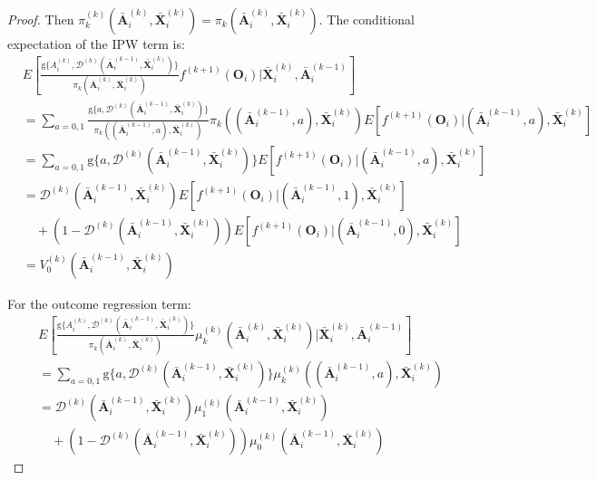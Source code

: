 \documentclass[11pt]{article}
\theoremstyle{referenceplain}
\theoremstyle{referencedefinition}
\theoremstyle{referenceremark}
\begin{document}
\begin{proof}
Then $\pi_k^{(k)}(\bar{\mathbf{A}}_i^{(k)}, \bar{\mathbf{X}}_i^{(k)}) = \pi_k(\bar{\mathbf{A}}_i^{(k)}, \bar{\mathbf{X}}_i^{(k)})$. The conditional expectation of the IPW term is:
\begin{align*}
    &E\left[\frac{\mathrm{g}\{A_i^{(k)}, \mathcal{D}^{(k)}(\bar{\mathbf{A}}_i^{(k-1)}, \bar{\mathbf{X}}_i^{(k)})\}}{\pi_k(\bar{\mathbf{A}}_i^{(k)}, \bar{\mathbf{X}}_i^{(k)})} f^{(k+1)}(\mathbf{O}_i)\bigg|\bar{\mathbf{X}}_i^{(k)}, \bar{\mathbf{A}}_i^{(k-1)}\right]\\
    &= \sum_{a=0,1} \frac{\mathrm{g}\{a, \mathcal{D}^{(k)}(\bar{\mathbf{A}}_i^{(k-1)}, \bar{\mathbf{X}}_i^{(k)})\}}{\pi_k((\bar{\mathbf{A}}_i^{(k-1)}, a), \bar{\mathbf{X}}_i^{(k)})} \pi_k((\bar{\mathbf{A}}_i^{(k-1)}, a), \bar{\mathbf{X}}_i^{(k)}) E[f^{(k+1)}(\mathbf{O}_i)|(\bar{\mathbf{A}}_i^{(k-1)}, a), \bar{\mathbf{X}}_i^{(k)}]\\
    &= \sum_{a=0,1} \mathrm{g}\{a, \mathcal{D}^{(k)}(\bar{\mathbf{A}}_i^{(k-1)}, \bar{\mathbf{X}}_i^{(k)})\} E[f^{(k+1)}(\mathbf{O}_i)|(\bar{\mathbf{A}}_i^{(k-1)}, a), \bar{\mathbf{X}}_i^{(k)}]\\
    &= \mathcal{D}^{(k)}(\bar{\mathbf{A}}_i^{(k-1)}, \bar{\mathbf{X}}_i^{(k)}) E[f^{(k+1)}(\mathbf{O}_i)|(\bar{\mathbf{A}}_i^{(k-1)}, 1), \bar{\mathbf{X}}_i^{(k)}]\\
    &\quad + (1-\mathcal{D}^{(k)}(\bar{\mathbf{A}}_i^{(k-1)}, \bar{\mathbf{X}}_i^{(k)})) E[f^{(k+1)}(\mathbf{O}_i)|(\bar{\mathbf{A}}_i^{(k-1)}, 0), \bar{\mathbf{X}}_i^{(k)}]\\
    &= V_0^{(k)}(\bar{\mathbf{A}}_i^{(k-1)}, \bar{\mathbf{X}}_i^{(k)})
\end{align*}

For the outcome regression term:
\begin{align*}
    &E\left[\frac{\mathrm{g}\{A_i^{(k)}, \mathcal{D}^{(k)}(\bar{\mathbf{A}}_i^{(k-1)}, \bar{\mathbf{X}}_i^{(k)})\}}{\pi_k(\bar{\mathbf{A}}_i^{(k)}, \bar{\mathbf{X}}_i^{(k)})} \mu_k^{(k)}(\bar{\mathbf{A}}_i^{(k)}, \bar{\mathbf{X}}_i^{(k)})\bigg|\bar{\mathbf{X}}_i^{(k)}, \bar{\mathbf{A}}_i^{(k-1)}\right]\\
    &= \sum_{a=0,1} \mathrm{g}\{a, \mathcal{D}^{(k)}(\bar{\mathbf{A}}_i^{(k-1)}, \bar{\mathbf{X}}_i^{(k)})\} \mu_k^{(k)}((\bar{\mathbf{A}}_i^{(k-1)}, a), \bar{\mathbf{X}}_i^{(k)})\\
    &= \mathcal{D}^{(k)}(\bar{\mathbf{A}}_i^{(k-1)}, \bar{\mathbf{X}}_i^{(k)}) \mu_1^{(k)}(\bar{\mathbf{A}}_i^{(k-1)}, \bar{\mathbf{X}}_i^{(k)})\\
    &\quad + (1-\mathcal{D}^{(k)}(\bar{\mathbf{A}}_i^{(k-1)}, \bar{\mathbf{X}}_i^{(k)})) \mu_0^{(k)}(\bar{\mathbf{A}}_i^{(k-1)}, \bar{\mathbf{X}}_i^{(k)})
\end{align*}


\end{proof}
\end{document}
